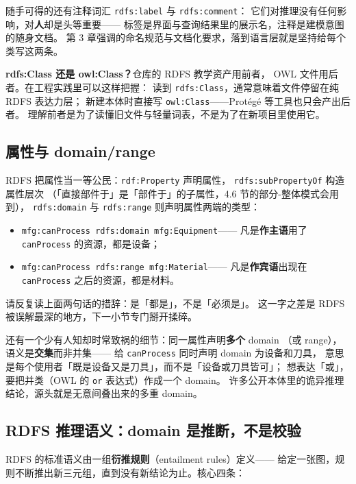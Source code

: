 随手可得的还有注释词汇 \texttt{rdfs:label} 与 \texttt{rdfs:comment}：
它们对推理没有任何影响，对\textbf{人}却是头等重要——
标签是界面与查询结果里的展示名，注释是建模意图的随身文档。
第 3 章强调的命名规范与文档化要求，落到语言层就是坚持给每个类写这两条。

\begin{noteblock}
\textbf{rdfs:Class 还是 owl:Class？}仓库的 RDFS 教学资产用前者，
OWL 文件用后者。在工程实践里可以这样把握：
读到 \texttt{rdfs:Class}，通常意味着文件停留在纯 RDFS 表达力层；
新建本体时直接写 \texttt{owl:Class}——Protégé 等工具也只会产出后者。
理解前者是为了读懂旧文件与轻量词表，不是为了在新项目里使用它。
\end{noteblock}

\subsection{属性与 domain/range}

RDFS 把属性当一等公民：\texttt{rdf:Property} 声明属性，
\texttt{rdfs:subPropertyOf} 构造属性层次
（「直接部件于」是「部件于」的子属性，4.6 节的部分-整体模式会用到），
\texttt{rdfs:domain} 与 \texttt{rdfs:range} 则声明属性两端的类型：

\begin{itemize}
  \item \texttt{mfg:canProcess rdfs:domain mfg:Equipment}——
        凡是\textbf{作主语}用了 \texttt{canProcess} 的资源，都是设备；
  \item \texttt{mfg:canProcess rdfs:range mfg:Material}——
        凡是\textbf{作宾语}出现在 \texttt{canProcess} 之后的资源，都是材料。
\end{itemize}

请反复读上面两句话的措辞：是「都是」，不是「必须是」。
这一字之差是 RDFS 被误解最深的地方，下一小节专门掰开揉碎。

还有一个少有人知却时常致祸的细节：同一属性声明\textbf{多个} domain
（或 range），语义是\textbf{交集}而非并集——
给 \texttt{canProcess} 同时声明 domain 为设备和刀具，
意思是每个使用者「既是设备又是刀具」，而不是「设备或刀具皆可」；
想表达「或」，要把并类（OWL 的 \texttt{or} 表达式）作成一个 domain。
许多公开本体里的诡异推理结论，源头就是无意间叠出来的多重 domain。

\subsection{RDFS 推理语义：domain 是推断，不是校验}

RDFS 的标准语义由一组\textbf{衍推规则}（entailment rules）定义——
给定一张图，规则不断推出新三元组，直到没有新结论为止。核心四条：

